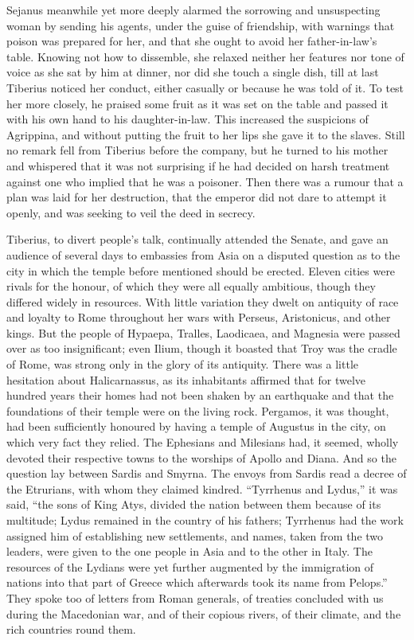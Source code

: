 
Sejanus meanwhile yet more deeply alarmed the sorrowing and unsuspecting woman by sending his agents, under the guise of friendship, with warnings that poison was prepared for her, and that she ought to avoid her father-in-law's table. Knowing not how to dissemble, she relaxed neither her features nor tone of voice as she sat by him at dinner, nor did she touch a single dish, till at last Tiberius noticed her conduct, either casually or because he was told of it. To test her more closely, he praised some fruit as it was set on the table and passed it with his own hand to his daughter-in-law. This increased the suspicions of Agrippina, and without putting the fruit to her lips she gave it to the slaves. Still no remark fell from Tiberius before the company, but he turned to his mother and whispered that it was not surprising if he had decided on harsh treatment against one who implied that he was a poisoner. Then there was a rumour that a plan was laid for her destruction, that the emperor did not dare to attempt it openly, and was seeking to veil the deed in secrecy.


Tiberius, to divert people's talk, continually attended the Senate, and gave an audience of several days to embassies from Asia on a disputed question as to the city in which the temple before mentioned should be erected. Eleven cities were rivals for the honour, of which they were all equally ambitious, though they differed widely in resources. With little variation they dwelt on antiquity of race and loyalty to Rome throughout her wars with Perseus, Aristonicus, and other kings. But the people of Hypaepa, Tralles, Laodicaea, and Magnesia were passed over as too insignificant; even Ilium, though it boasted that Troy was the cradle of Rome, was strong only in the glory of its antiquity. There was a little hesitation about Halicarnassus, as its inhabitants affirmed that for twelve hundred years their homes had not been shaken by an earthquake and that the foundations of their temple were on the living rock. Pergamos, it was thought, had been sufficiently honoured by having a temple of Augustus in the city, on which very fact they relied. The Ephesians and Milesians had, it seemed, wholly devoted their respective towns to the worships of Apollo and Diana. And so the question lay between Sardis and Smyrna. The envoys from Sardis read a decree of the Etrurians, with whom they claimed kindred. ``Tyrrhenus and Lydus,'' it was said, ``the sons of King Atys, divided the nation between them because of its multitude; Lydus remained in the country of his fathers; Tyrrhenus had the work assigned him of establishing new settlements, and names, taken from the two leaders, were given to the one people in Asia and to the other in Italy. The resources of the Lydians were yet further augmented by the immigration of nations into that part of Greece which afterwards took its name from Pelops.'' They spoke too of letters from Roman generals, of treaties concluded with us during the Macedonian war, and of their copious rivers, of their climate, and the rich countries round them.

